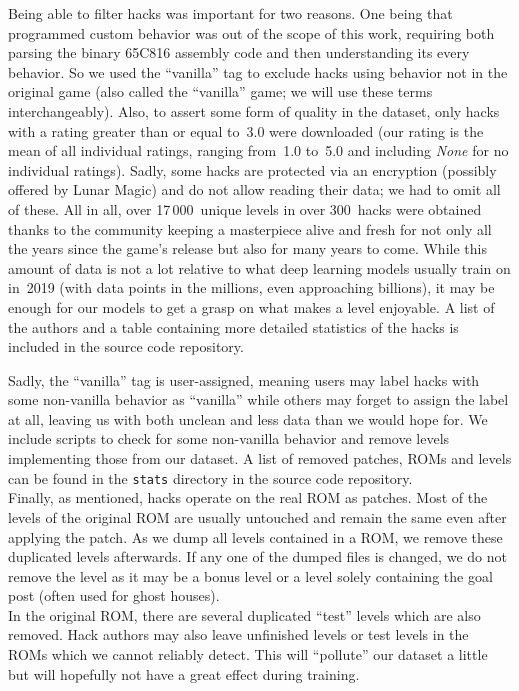 Being able to filter hacks was important for two reasons. One being
that programmed custom behavior was out of the scope of this work,
requiring both parsing the binary 65C816 assembly code and then
understanding its every behavior. So we used the ``vanilla'' tag to
exclude hacks using behavior not in the original game (also called the
``vanilla'' game; we will use these terms interchangeably). Also, to
assert some form of quality in the dataset, only hacks with a rating
greater than or equal to~3.0 were downloaded (our rating is the mean
of all individual ratings, ranging from~1.0 to~5.0 and including
\emph{None} for no individual ratings). Sadly, some hacks are
protected via an encryption (possibly offered by Lunar Magic) and do
not allow reading their data; we had to omit all of these. All in all,
over 17\,000~unique levels in over 300~hacks were obtained thanks to
the community keeping a masterpiece alive and fresh for not only all
the years since the game's release but also for many years to come.
While this amount of data is not a lot relative to what deep learning
models usually train on in~2019 (with data points in the millions,
even approaching billions), it may be enough for our models to get a
grasp on what makes a level enjoyable. A list of the authors and a
table containing more detailed statistics of the hacks is included in
the source code repository.

Sadly, the ``vanilla'' tag is user-assigned, meaning users may label
hacks with some non-vanilla behavior as ``vanilla'' while others may
forget to assign the label at all, leaving us with both unclean and
less data than we would hope for. We include scripts to check for some
non-vanilla behavior and remove levels implementing those from our
dataset. A list of removed patches, ROMs and levels can be found in
the \texttt{stats} directory in the source code repository. \\
Finally, as mentioned, hacks operate on the real ROM as patches. Most
of the levels of the original ROM are usually untouched and remain the
same even after applying the patch. As we dump all levels contained in
a ROM, we remove these duplicated levels afterwards. If any one of the
dumped files is changed, we do not remove the level as it may be a
bonus level or a level solely containing the goal post (often used for
ghost houses). \\
In the original ROM, there are several duplicated ``test'' levels
which are also removed. Hack authors may also leave unfinished levels
or test levels in the ROMs which we cannot reliably detect. This will
``pollute'' our dataset a little but will hopefully not have a great
effect during training.

